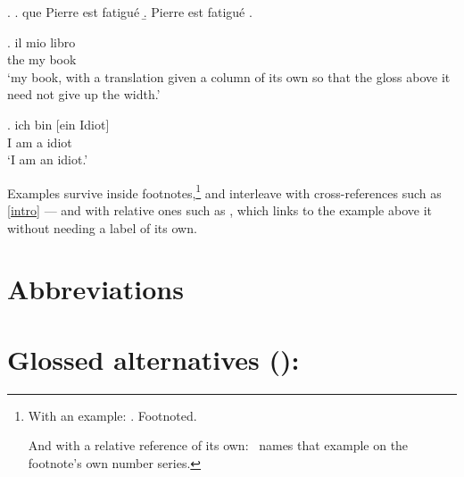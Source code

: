 \documentclass{article}
\begin{document}
{\ExAnnotFit
\ex.
\a. que Pierre est fatigué\exannot{[CP]}
\b. Pierre est fatigué\exannot{[TP]}
\z.}

{\GlossTransSide
\exg. il mio libro\\ the my book\\
\glt `my book, with a translation given a column of its own so that the
      gloss above it need not give up the width.'}

{\GlossPhantomAlign
\exg. ich bin [ein Idiot]\\ I am a idiot\\
\glt `I am an idiot.'}

Examples survive inside footnotes,\footnote{With an example: \ex. Footnoted.

And with a relative reference of its own: \Last\ names that example on the
footnote's own number series.
} and interleave with cross-references such as \ref{intro} --- and with
relative ones such as \Last, which links to the example above it without
needing a label of its own.


\section{Abbreviations}
\lpzglist

\section{Glossed alternatives (\texttt{\string\altg}):}
\end{document}
